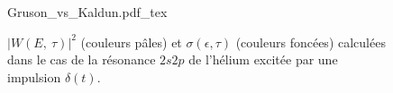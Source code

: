 \begin{figure}
\centering
\def\svgwidth{0.8\textwidth}
{Gruson_vs_Kaldun.pdf_tex}
\caption{$|W(E, \:  \tau)|^2$ (couleurs pâles) et $\sigma(\epsilon,\tau)$ (couleurs foncées) calculées dans le cas de la résonance $2s2p$ de l'hélium excitée par une impulsion $\delta(t)$.}
\label{fig:Gruson_vs_Kaldun}
\end{figure}




